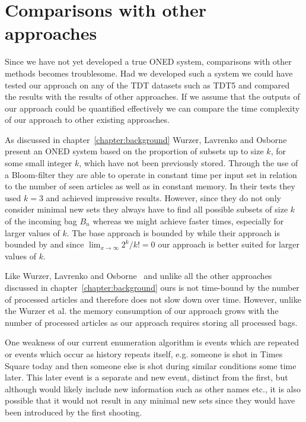 \section{Comparisons with other approaches}
Since we have not yet developed a true ONED system, comparisons with other methods becomes troublesome. Had we developed such a system we could have tested our approach on any of the TDT datasets such as TDT5 and compared the results with the results of other approaches. If we assume that the outputs of our approach could be quantified effectively we can compare the time complexity of our approach to other existing approaches.

As discussed in chapter~\ref{chapter:background} Wurzer, Lavrenko and Osborne~\cite{wurzer2015kterm} present an ONED system based on the proportion of subsets up to size $k$, for some small integer $k$, which have not been previously stored. Through the use of a Bloom-filter they are able to operate in constant time per input set in relation to the number of seen articles as well as in constant memory. In their tests they used $k=3$ and achieved impressive results. However, since they do not only consider minimal new sets they always have to find all possible subsets of size $k$ of the incoming bag $B_{n}$ whereas we might achieve faster times, especially for larger values of $k$. The base approach is bounded by  while their approach is bounded by  and since $\lim_{x \to \infty}2^{k}/k!=0$ our approach is better suited for larger values of $k$. 

Like Wurzer, Lavrenko and Osborne~\cite{wurzer2015kterm} and unlike all the other approaches discussed in chapter~\ref{chapter:background} ours is not time-bound by the number of processed articles and therefore does not slow down over time. However, unlike the Wurzer et al. the memory consumption of our approach grows with the number of processed articles as our approach requires storing all processed bags. 

One weakness of our current enumeration algorithm is events which are repeated or events which occur as history repeats itself, e.g. someone is shot in Times Square today and then someone else is shot during similar conditions some time later. This later event is a separate and new event, distinct from the first, but although would likely include new information such as other names etc., it is also possible that it would not result in any minimal new sets since they would have been introduced by the first shooting.

